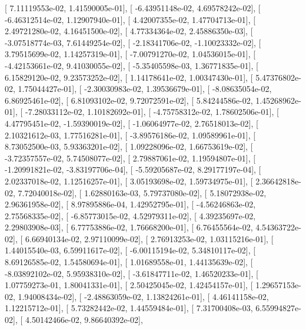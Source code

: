 \documentclass{article}
\begin{document}
       [  7.11119553e-02,   1.41590005e-01],
       [ -6.43951148e-02,   4.69578242e-02],
       [ -6.46312514e-02,   1.12907940e-01],
       [  4.42007355e-02,   1.47704713e-01],
       [  2.49721280e-02,   4.16451500e-02],
       [  4.77334364e-02,   2.45886350e-03],
       [ -3.07518774e-03,   7.61449254e-02],
       [ -2.18341706e-02,  -1.10023332e-02],
       [  3.79515699e-02,   1.14257319e-01],
       [ -7.00791270e-02,   1.04536015e-01],
       [ -4.42153661e-02,   9.41030055e-02],
       [ -5.35405598e-03,   1.36771835e-01],
       [  6.15829120e-02,   9.23573252e-02],
       [  1.14178641e-02,   1.00347430e-01],
       [  5.47376802e-02,   1.75044427e-01],
       [ -2.30030983e-02,   1.39536679e-01],
       [ -8.08635054e-02,   6.86925461e-02],
       [  6.81093102e-02,   9.72072591e-02],
       [  5.84244586e-02,   1.45268962e-01],
       [ -7.28033112e-02,   1.10182692e-01],
       [ -4.75758312e-02,   1.78602506e-01],
       [  4.47795451e-02,  -1.59390019e-02],
       [ -1.06064977e-02,   2.76518013e-02],
       [  2.10321612e-03,   1.77516281e-01],
       [ -3.89576186e-02,   1.09589961e-01],
       [  8.73052500e-03,   5.93363201e-02],
       [  1.09228096e-02,   1.66753619e-02],
       [ -3.72357557e-02,   5.74508077e-02],
       [  2.79887061e-02,   1.19594807e-01],
       [ -1.20991821e-02,  -3.83197706e-04],
       [ -5.59205687e-02,   8.29177197e-04],
       [  2.02337018e-02,   1.12516257e-01],
       [  3.05193698e-02,   1.59734975e-01],
       [  2.36642818e-02,   7.72040018e-02],
       [  1.62880163e-03,   5.79737080e-02],
       [  5.18072938e-02,   2.96361958e-02],
       [  8.97895886e-04,   1.42952795e-01],
       [ -4.56246863e-02,   2.75568335e-02],
       [ -6.85773015e-02,   4.52979311e-02],
       [  4.39235697e-02,   2.29803908e-03],
       [  6.77753886e-02,   1.76668200e-01],
       [  6.76455564e-02,   4.54363722e-02],
       [  6.66940134e-02,   2.97110099e-02],
       [  2.76913253e-02,   1.03115216e-01],
       [  1.44015540e-03,   6.59911617e-02],
       [ -6.00115194e-02,   5.34810117e-02],
       [  8.69126585e-02,   1.54580694e-01],
       [  1.01689558e-01,   1.44135639e-02],
       [ -8.03892102e-02,   5.95938310e-02],
       [ -3.61847711e-02,   1.46520233e-01],
       [  1.07759273e-01,   1.80041331e-01],
       [  2.50425045e-02,   1.42454157e-01],
       [  1.29657153e-02,   1.94008434e-02],
       [ -2.48863059e-02,   1.13824261e-01],
       [  4.46141158e-02,   1.12215712e-01],
       [  5.73282442e-02,   1.44559484e-01],
       [  7.31700408e-03,   6.55994827e-02],
       [  4.50142466e-02,   9.86640392e-02],
\end{document}
